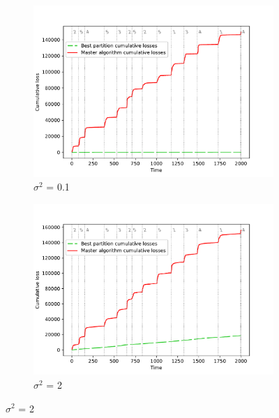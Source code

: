 \documentclass[12pt, twoside]{article}
\begin{document}
\begin{figure}[H]
    \centering 
\begin{subfigure}{0.49\textwidth}
  \includegraphics[width=\linewidth]{dec_noise_0.1}
  \caption{$\sigma^2$ = 0.1}
  \label{fig:n_1}
\end{subfigure}\hfil 
\begin{subfigure}{0.49\textwidth}
  \includegraphics[width=\linewidth]{dec_noise_2}
  \caption{$\sigma^2$ = 2}
  \label{fig:n_2}
\end{subfigure}\hfil 


\end{figure}
\end{document}
